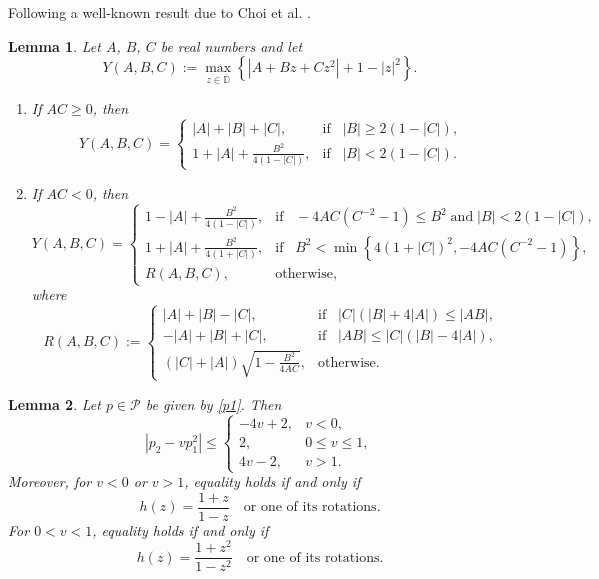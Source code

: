 \documentclass[10pt,a4paper]{amsart}
\newtheorem{lem}{Lemma}[section]
\newcommand{\ol}{\overline}
\numberwithin{equation}{section}
\begin{document}
Following a well-known result due to Choi et al. \cite{CKS1}.
\begin{lem}\label{L2}\cite{CKS1} Let $A$, $B$, $C$ be real numbers and let
\[Y(A, B, C):= \max\limits_{z\in \ol{\mathbb{D}}}\left\lbrace |A+Bz+Cz^2|+1-|z|^2\right\rbrace.\]
\begin{enumerate} 
\item[(i)] If $AC\ge 0$, then
\[Y(A, B, C) =
\begin{cases}
|A|+|B|+|C|, & \text{if}\;\;\; |B|\ge 2(1-|C|), \\
1+|A|+\frac{B^2}{4(1-|C|)}, &\text{if}\;\;\; |B|<2(1-|C|).
\end{cases}
\]
\item[(ii)] If $AC<0$, then 
\[Y(A,B,C)=
\begin{cases}
1-|A|+\frac{B^2}{4(1-|C|)}, &\text{if}\;\;\; -4AC(C^{-2}-1) \le B^2\; \text{and}\; |B|<2(1-|C|), \\
1+|A|+\frac{B^2}{4(1+|C|)}, &\text{if}\;\;\; B^2<\min\left\{4(1+|C|)^2, -4AC(C^{-2}-1) \right\}, \\
R(A,B,C), &\text{otherwise},
\end{cases}
\]
where
\[R(A,B,C):=
\begin{cases}
|A|+|B|-|C|, & \text{if}\;\;\; |C|(|B|+4|A|) \le |AB|, \\
-|A|+|B|+|C|, & \text{if}\;\;\; |AB|\le |C|(|B|-4|A|), \\
(|C|+|A| )\sqrt{1-\frac{B^2}{4AC}}, &\text{otherwise}.
\end{cases}
\]
\end{enumerate} 
\end{lem}

\begin{lem}\label{L3} \cite{MM}
Let $p \in \mathcal{P}$ be given by \eqref{p1}. Then
\[
\left| p_2 - v p_1^2 \right| \le 
\begin{cases}
-4v + 2, & v < 0, \\
2, & 0 \le v \le 1, \\
4v - 2, & v > 1.
\end{cases}
\]
Moreover, for $v < 0$ or $v > 1$, equality holds if and only if
\[
h(z) = \frac{1+z}{1-z} \quad \text{or one of its rotations}.
\]
For $0 < v < 1$, equality holds if and only if
\[
h(z) = \frac{1+z^2}{1-z^2} \quad \text{or one of its rotations}.
\]
\end{lem}
\end{document}
